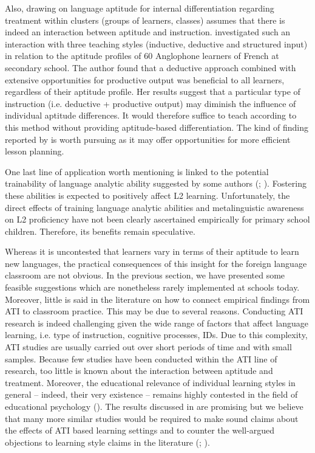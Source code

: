\documentclass[output=paper]{langscibook}
\begin{document}
Also, drawing on language aptitude for internal differentiation regarding treatment within clusters (groups of learners, classes) assumes that there is indeed an interaction between aptitude and instruction. \citet{Erlam2005} investigated such an interaction with three teaching styles (inductive, deductive and structured input) in relation to the aptitude profiles of 60 Anglophone learners of French at secondary school. The author found that a deductive approach combined with extensive opportunities for productive output was beneficial to all learners, regardless of their aptitude profile. Her results suggest that a particular type of instruction (i.e. deductive + productive output) may diminish the influence of individual aptitude differences. It would therefore suffice to teach according to this method without providing aptitude-based differentiation. The kind of finding reported by \citet{Erlam2005} is worth pursuing as it may offer opportunities for more efficient lesson planning.

One last line of application worth mentioning is linked to the potential trainability of language analytic ability suggested by some authors (\citealt{GrigorenkoEtAl2000}; \citealt{SafarKormos2008}). Fostering these abilities is expected to positively affect L2 learning. Unfortunately, the direct effects of training language analytic abilities and metalinguistic awareness on L2 proficiency have not been clearly ascertained empirically for primary school children. Therefore, its benefits remain speculative.


Whereas it is uncontested that learners vary in terms of their aptitude to learn new languages, the practical consequences of this insight for the foreign language classroom are not obvious. In the previous section, we have presented some feasible suggestions which are nonetheless rarely implemented at schools today. Moreover, little is said in the literature on how to connect empirical findings from ATI to classroom practice. This may be due to several reasons. Conducting ATI research is indeed challenging given the wide range of factors that affect language learning, i.e. type of instruction, cognitive processes, IDs. Due to this complexity, ATI studies are usually carried out over short periods of time and with small samples. Because few studies have been conducted within the ATI line of research, too little is known about the interaction between aptitude and treatment. Moreover, the educational relevance of individual learning styles in general – indeed, their very existence – remains highly contested in the field of educational psychology (\citealt{RienerWillingham2010}). The results discussed in  are promising but we believe that many more similar studies would be required to make sound claims about the effects of ATI based learning settings and to counter the well-argued objections to learning style claims in the literature (\citealt{PashlerEtAl2008}; \citealt{RienerWillingham2010}). 
\end{document}
